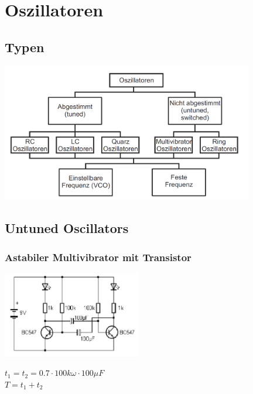\section{Oszillatoren}
\subsection{Typen}
	\begin{center}
		\includegraphics[width=11cm]{images/osziTypen.png}
	\end{center}

\subsection{Untuned Oscillators}
	\subsubsection{Astabiler Multivibrator mit Transistor}
	\begin{minipage}{6cm}
		\includegraphics[width=6cm]{images/multiVibrator}
	\end{minipage}
	\begin{minipage}{10cm}
		$t_1 = t_2 = 0.7 \cdot 100k\omega \cdot 100\mu F$ \\
		$T = t_1 + t_2$
	\end{minipage}

